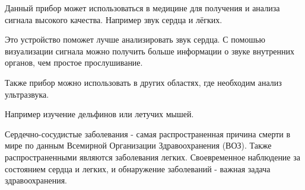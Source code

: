 \documentclass[../paper.tex]{subfiles}
\begin{document}
Данный прибор может использоваться в медицине для получения и анализа сигнала высокого качества. Например звук сердца и лёгких. 

Это устройство поможет лучше анализировать звук сердца. С помошью визуализации сигнала можно получить больше информации о звуке внутренних органов, чем простое прослушивание.

Также прибор можно использовать в других областях, где необходим анализ ультразвука. 

Например изучение дельфинов или летучих мышей. 

Сердечно-сосудистые заболевания - самая распространенная причина смерти в мире по данным Всемирной Организации Здравоохранения (ВОЗ). Также распространенными являются заболевания легких. Своевременное наблюдение за состоянием сердца и легких, и обнаружение заболеваний - важная задача здравоохранения.
\end{document}
